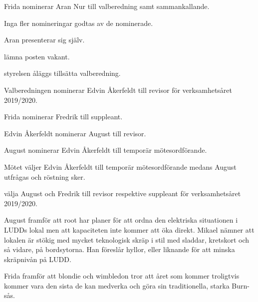 \documentclass{protokoll}
\begin{document}
Frida nominerar Aran Nur till valberedning samt sammankallande. 

Inga fler nomineringar godtas av de nominerade. %

Aran presenterar sig själv. 

\begin{beslut}
  \att lämna posten vakant. 
\end{beslut}

\begin{beslut}
  \att styrelsen åläggs tillsätta valberedning.
\end{beslut}

Valberedningen nominerar Edvin Åkerfeldt till revisor för verksamhetsåret 2019/2020.

Frida nominerar Fredrik till suppleant. 

Edvin Åkerfeldt nominerar August till revisor.

August nominerar Edvin Åkerfeldt till temporär mötesordförande. 

Mötet väljer Edvin Åkerfeldt till temporär mötesordförande medans August
utfrågas och röstning sker. 

\begin{beslut}
  \att välja August och Fredrik till revisor respektive suppleant för verksamhetsåret 2019/2020.
\end{beslut}

August framför att root har planer för att ordna den elektriska situationen
i LUDDs lokal men att kapaciteten inte kommer att öka direkt.
Mikael nämner att lokalen är stökig med mycket teknologisk skräp i stil med
sladdar, kretskort och så vidare, på bordsytorna. Han föreslår hyllor, eller 
liknande för att minska skräpnivån på LUDD.

Frida framför att blondie och wimbledon tror att året som kommer troligtvis
kommer vara den sista de kan medverka och göra sin traditionella, starka 
Burn-sås.
\end{document}
